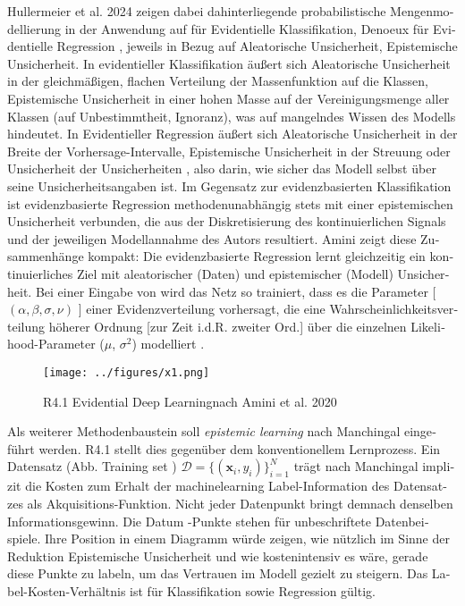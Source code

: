 \begin{otherlanguage}{ngerman}
Hullermeier et al. 2024 zeigen dabei dahinterliegende probabilistische Mengenmodellierung \parencite{javanmardi2024conformalized} in der Anwendung auf für Evidentielle Klassifikation, Denoeux für Evidentielle Regression \parencite{denoeux2022evidential}, jeweils in Bezug auf \gls{Aleatorische Unsicherheit}, \gls{Epistemische Unsicherheit}. In evidentieller Klassifikation äußert sich \gls{Aleatorische Unsicherheit} in der gleichmäßigen, flachen Verteilung der Massenfunktion auf die Klassen, \gls{Epistemische Unsicherheit} in einer hohen Masse auf der Vereinigungsmenge aller Klassen (auf Unbestimmtheit, Ignoranz), was auf mangelndes Wissen des Modells hindeutet. In Evidentieller Regression äußert sich \gls{Aleatorische Unsicherheit} in der Breite der Vorhersage-Intervalle, \gls{Epistemische Unsicherheit} in der Streuung oder \glqq Unsicherheit der Unsicherheiten \grqq, also darin, wie sicher das Modell selbst über seine Unsicherheitsangaben ist. Im Gegensatz zur evidenzbasierten Klassifikation ist evidenzbasierte Regression methodenunabhängig stets mit einer epistemischen Unsicherheit verbunden, die aus der Diskretisierung des kontinuierlichen Signals und der jeweiligen Modellannahme des Autors resultiert. Amini zeigt diese Zusammenhänge kompakt: \glqq Die evidenzbasierte Regression
lernt gleichzeitig ein kontinuierliches Ziel mit aleatorischer
(Daten) und epistemischer (Modell) Unsicherheit. Bei einer Eingabe von
wird das Netz so trainiert, dass es die Parameter [ $(\alpha, \beta, \sigma, \nu)$ ] einer Evidenzverteilung vorhersagt, die eine Wahrscheinlichkeitsverteilung höherer Ordnung [zur Zeit i.d.R. zweiter Ord.] über die einzelnen Likelihood-Parameter ($\mu$, $\sigma^{2}$) modelliert \grqq \parencite[S.1, Figure 1]{amini2020deep}.

\begin{figure}[!ht]
  \centering
  \texttt{[image: ../figures/x1.png]}
  \caption{R4.1 \glqq Evidential Deep Learning\grqq nach Amini et al. 2020}
\end{figure}

Als weiterer Methodenbaustein soll \textit{epistemic learning} nach Manchingal eingeführt werden. R4.1 stellt dies gegenüber dem konventionellem Lernprozess. Ein Datensatz (Abb. \glqq Training set \grqq) $\mathcal{D} = \{ (\mathbf{x}_i, y_i) \}_{i=1}^N$ trägt nach Manchingal implizit die Kosten zum Erhalt der \gls{machinelearning} Label-Information des Datensatzes als Akquisitions-Funktion. Nicht jeder Datenpunkt bringt demnach denselben Informationsgewinn. Die \glqq Datum \grqq-Punkte stehen für unbeschriftete Datenbeispiele. Ihre Position in einem Diagramm würde zeigen, wie nützlich im Sinne der Reduktion \gls{Epistemische Unsicherheit} und wie kostenintensiv es wäre, gerade diese Punkte zu labeln, um das Vertrauen im Modell gezielt zu steigern. Das Label-Kosten-Verhältnis ist für Klassifikation sowie Regression gültig. 


\end{otherlanguage}
